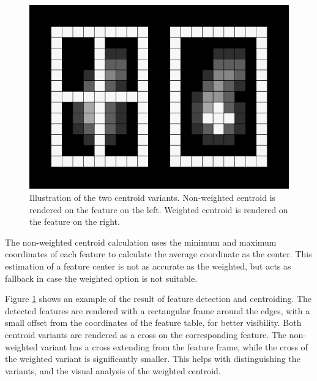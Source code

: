\documentclass[12pt]{report}
\begin{document}
\begin{figure}[h]
    \centering
    \includegraphics[scale=0.25]{figures/centroid.png}
    \caption{Illustration of the two centroid variants. Non-weighted centroid is rendered on the feature on the left. Weighted centroid is rendered on the feature on the right.}
    \label{fig:centroids}
\end{figure}

The non-weighted centroid calculation uses the minimum and maximum coordinates of each feature to calculate the average coordinate as the center. This estimation of a feature center is not as accurate as the weighted, but acts as fallback in case the weighted option is not suitable.
\par
Figure \ref*{fig:centroids} shows an example of the result of feature detection and centroiding. The detected features are rendered with a rectangular frame around the edges, with a small offset from the coordinates of the feature table, for better visibility. Both centroid variants are rendered as a cross on the corresponding feature. The non-weighted variant has a cross extending from the feature frame, while the cross of the weighted variant is significantly smaller. This helps with distinguishing the variants, and the visual analysis of the weighted centroid.
\end{document}
